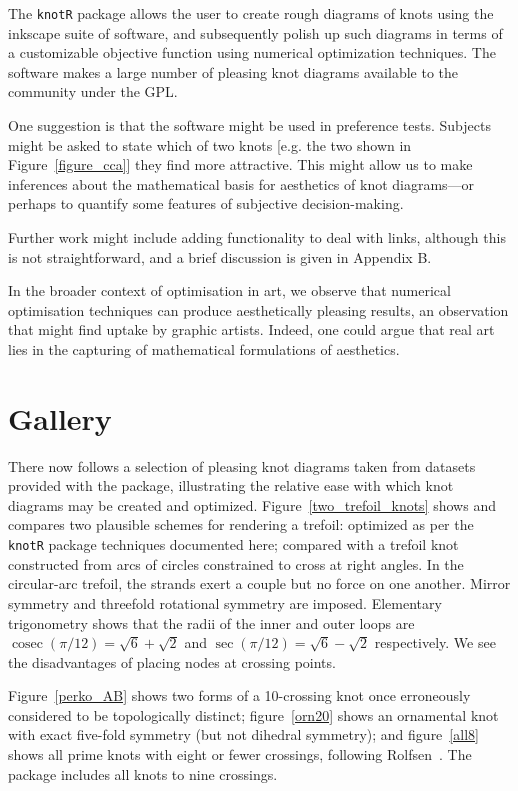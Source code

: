 \documentclass{birkjour}
\theoremstyle{definition}
\theoremstyle{remark}
\numberwithin{equation}{section}
\begin{document}
The {\tt knotR} package allows the user to create rough diagrams of
knots using the inkscape suite of software, and subsequently polish up
such diagrams in terms of a customizable objective function using
numerical optimization techniques.  The software makes a large number
of pleasing knot diagrams available to the community under the GPL.

One suggestion is that the software might be used in preference tests.
Subjects might be asked to state which of two knots [e.g. the two
  shown in Figure~\ref{figure_cca}] they find more attractive.  This
might allow us to make inferences about the mathematical basis for
aesthetics of knot diagrams---or perhaps to quantify some features of
subjective decision-making.

Further work might include adding functionality to deal with links,
although this is not straightforward, and a brief discussion is given
in Appendix B.

In the broader context of optimisation in art, we observe that
numerical optimisation techniques can produce aesthetically pleasing
results, an observation that might find uptake by graphic artists.
Indeed, one could argue that real art lies in the capturing of
mathematical formulations of aesthetics.

\clearpage
\section{Gallery}

There now follows a selection of pleasing knot diagrams taken from
datasets provided with the package, illustrating the relative ease
with which knot diagrams may be created and optimized.
Figure~\ref{two_trefoil_knots} shows and compares two plausible
schemes for rendering a trefoil: optimized as per the {\tt knotR}
package techniques documented here; compared with a trefoil knot
constructed from arcs of circles constrained to cross at right angles.
In the circular-arc trefoil, the strands exert a couple but no force
on one another.  Mirror symmetry and threefold rotational symmetry are
imposed.  Elementary trigonometry shows that the radii of the inner
and outer loops are $\operatorname{cosec}(\pi/12)=\sqrt{6}+\sqrt{2}$
and $\sec(\pi/12)=\sqrt{6}-\sqrt{2}$ respectively.  We see the
disadvantages of placing nodes at crossing points.

Figure~\ref{perko_AB} shows two
forms of a 10-crossing knot once erroneously considered to be
topologically distinct; figure~\ref{orn20} shows an ornamental knot
with exact five-fold symmetry (but not dihedral symmetry); and
figure~\ref{all8} shows all prime knots with eight or fewer crossings,
following Rolfsen~\cite{rolfsen1976}.  The package includes all knots
to nine crossings.
\end{document}
